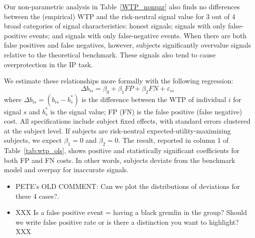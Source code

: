 \documentclass[12pt,a4paper]{article}
\newcommand{\agt}[1]{{\color{OliveGreen}#1}}
\newcommand{\pmt}[1]{{\color{Blue}#1}}
\begin{document}
Our non-parametric analysis in Table~\ref{WTP_nonpar} also finds no differences between the (empirical) WTP and the risk-neutral signal value for 3 out of 4 broad categories of signal characteristics: honest signals; signals with only false-positive events; and signals with only false-negative events. When there are both false positives and false negatives, however, subjects significantly overvalue signals relative to the theoretical benchmark. These signals also tend to cause overprotection in the IP task.






We estimate these relationships more formally with the following regression:
\[\Delta b_{is} = \beta_0 + \beta_1 FP + \beta_2 FN + \varepsilon_{is}\]
where $\Delta b_{is} = (b_{is} - b^*_s)$ is the difference between the WTP of individual $i$ for signal $s$ and $b^*_s$ is the signal value; FP (FN) is the false positive (false negative) cost. All specifications include subject fixed effects, with standard errors clustered at the subject level. If subjects are risk-neutral expected-utility-maximizing subjects, we expect $\beta_1=0$ and $\beta_2=0$. The result, reported in column 1 of Table~\ref{tab:wtp_ols}, shows positive and statistically significant coefficients for both FP and FN costs. In other words, subjects deviate from the benchmark model and overpay for inaccurate signals. 


\begin{itemize}
	\item\pmt{PETE's OLD COMMENT: Can we plot the distributions of deviations for these 4 cases?}. 
	\item\agt{XXX Is a false positive event = having a black gremlin in the group? Should we write false positive rate or is there a distinction you want to highlight? XXX}
\end{itemize}


\end{document}
